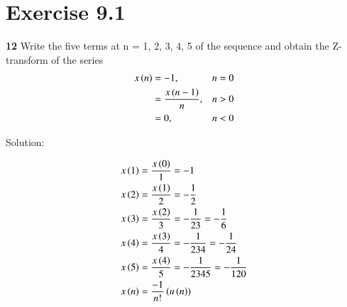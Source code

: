 \documentclass[journal,12pt,twocolumn]{IEEEtran}
\begin{document}


\vspace{3cm}

\title{}
\author{EE23BTECH11217 - Prajwal M$^{*}$
}
\maketitle
\newpage
\bigskip



\section*{Exercise 9.1}

\noindent \textbf{12} \hspace{2pt}Write the five terms at n = 1, 2, 3, 4, 5 of the sequence and obtain the Z-transform of the series
\begin{align}
    x \left(n\right) &=  -1, & n = 0 \\
    &=   \frac{x \left(n-1\right)}{n}, & n > 0\\
    &=   0, & n < 0 
\end{align}

\noindent Solution:

\noindent
\begin{align}
	x \left(1\right) & = \frac{x \left(0\right)}{1} = -1 \\
x \left(2\right) & = \frac{x \left(1\right)}{2} = -\frac{1}{2} \\
x \left(3\right) & = \frac{x \left(2\right)}{3} = -\frac{1}{2   3} = -\frac{1}{6}\\
x \left(4\right) & = \frac{x \left(3\right)}{4} = -\frac{1}{2   3   4} = -\frac{1}{24}\\
x \left(5\right) & = \frac{x \left(4\right)}{5} = -\frac{1}{2   3   4   5} = -\frac{1}{120} \\
    x \left(n\right) & = \frac{-1}{n!}  \left(u \left(n\right)\right) \label{x(n)}
\end{align}
\end{document}
